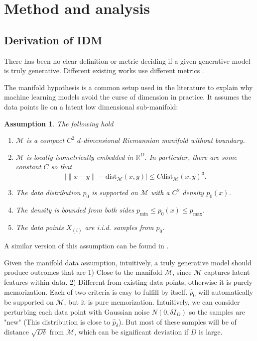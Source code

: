 \documentclass{article}
\newtheorem{aspt}{Assumption}[section]
\def\phat{\hat{p}}
\def\calM{\mathcal{M}}
\begin{document}
\section{Method and analysis}
\label{sec:method}
\subsection{Derivation of IDM}
There has been no clear definition or metric deciding if a given generative model is truly generative. 
Different existing works use different metrics \cite{zhang2023emergence,zhang2024wasserstein,baptista2025memorization}.

The manifold hypothesis \cite{fefferman2016testing} is a common setup used in the literature to explain why machine learning models avoid the curse of dimension in practice. It assumes the data points lie on a latent low dimensional sub-manifold:   
\begin{aspt}
\label{aspt:manifold}
The following hold
\begin{enumerate}
\item $\calM$ is a compact $C^2$ $d$-dimensional Riemannian manifold without boundary.
\item $\calM$ is locally isometrically embedded in $\mathbb{R}^D$. In particular, there are some constant $C$ so that 
\[
|\|x-y\|-\text{dist}_{\calM}(x,y)|\leq C\text{dist}_{\calM}(x,y)^3.
\]
\item The data distribution $p_0$ is supported on $\calM$ with a $C^2$ density $p_0(x)$.
\item The density is bounded from both sides $p_{\min}\leq p_0(x)\leq p_{\max}$.
\item The data points $X_{(i)}$ are i.i.d. samples from $p_0$. 
\end{enumerate}
\end{aspt}
A similar version of this assumption can be found in \cite{azangulov2024convergence}.


Given the manifold data assumption, intuitively, a truly generative model should produce outcomes that are 1) Close to the manifold $\calM$, since $\calM$ captures latent features within data. 2) Different from existing data points, otherwise it is purely memorization. Each of two criteria is easy to fulfill by itself. $\phat_0$ will automatically be supported on $\calM$, but it is pure memorization. Intuitively, we can consider perturbing each data point with Gaussian noise  $N(0,\delta I_D)$ so the samples are "new" (This distribution is close to $\phat_{\delta}$). But most of these samples will be of distance $\sqrt{D\delta}$ from $\calM$, which can be significant deviation if $D$ is large.  
\end{document}
